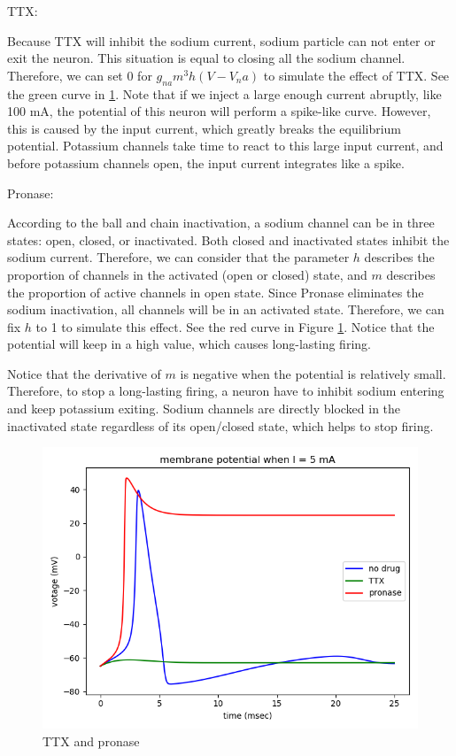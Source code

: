 \documentclass[11pt]{article}
\begin{document}
\begin{enumerate}
		TTX:
		
		Because TTX will inhibit the sodium current, sodium particle can not enter or exit the neuron. This situation is equal to closing all the sodium channel. Therefore, we can set 0 for $g_{na}m^3h(V-V_na)$ to simulate the effect of TTX. See the green curve in \ref{fig:fig5}. Note that if we inject a large enough current abruptly, like 100 mA, the potential of this neuron will perform a spike-like curve. However, this is caused by the input current, which greatly breaks the equilibrium potential. Potassium channels take time to react to this large input current, and before potassium channels open, the input current integrates like a spike.
		
		Pronase:
		
		According to the ball and chain inactivation, a sodium channel can be in three states: open, closed, or inactivated. Both closed and inactivated states inhibit the sodium current. Therefore, we can consider that the parameter $h$ describes the proportion of channels in the activated (open or closed) state, and $m$ describes the proportion of active channels in open state. Since Pronase eliminates the sodium inactivation, all channels will be in an activated state. Therefore, we can fix $h$ to 1 to simulate this effect. See the red curve in Figure \ref{fig:fig5}. Notice that the potential will keep in a high value, which causes long-lasting firing.
		
		Notice that the derivative of $m$ is negative when the potential is relatively small. Therefore, to stop a long-lasting firing, a neuron have to inhibit sodium entering and keep potassium exiting. Sodium channels are directly blocked in the inactivated state regardless of its open/closed state, which helps to stop firing.
		
		\begin{figure}[ht]
			\centering
			\includegraphics[scale=0.3]{plot_programming_7.png}
			\caption{TTX and pronase}
			\label{fig:fig5}
		\end{figure}
	\end{enumerate}
\end{document}
